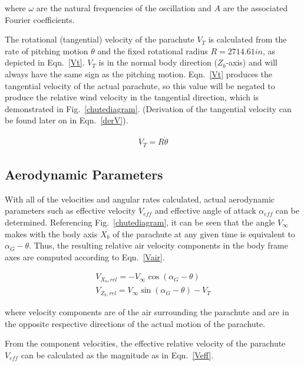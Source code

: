 \documentclass[]{aiaa-tc}%
\begin{document}
\noindent where $\omega$ are the natural frequencies of the oscillation and $A$ are the associated Fourier coefficients.

The rotational (tangential) velocity of the parachute $V_T$ is calculated from the rate of pitching motion $\dot{\theta}$ and the fixed rotational radius $R=2714.61 in$, as depicted in Eqn.~\ref{Vt}.  $V_T$ is in the normal body direction ($Z_b$-axis) and will always have the same sign as the pitching motion.  Eqn.~\ref{Vt} produces the tangential velocity of the actual parachute, so this value will be negated to produce the relative wind velocity in the tangential direction, which is demonstrated in Fig.~\ref{chutediagram}.  (Derivation of the tangential velocity can be found later on in Eqn.~\ref{derV}).

\begin{equation} \label{Vt}
\begin{gathered}
V_T = R \dot{\theta}
\end{gathered}
\end{equation}

\subsection{Aerodynamic Parameters}

With all of the velocities and angular rates calculated, actual aerodynamic parameters such as effective velocity $V_{eff}$ and effective angle of attack $\alpha_{eff}$ can be determined.  Referencing Fig.~\ref{chutediagram}, it can be seen that the angle $V_{\infty}$ makes with the body axis $X_b$ of the parachute at any given time is equivalent to $\alpha_G - \theta$.  Thus, the resulting relative air velocity components in the body frame axes are computed according to Eqn.~\ref{Vair}.

\begin{equation} \label{Vair}
\begin{gathered}
V_{X_b,rel} = -V_{\infty}\cos(\alpha_G - \theta) \\
V_{Z_b,rel} = V_{\infty}\sin(\alpha_G - \theta) - V_T
\end{gathered}
\end{equation}

\noindent where velocity components are of the air surrounding the parachute and are in the opposite respective directions of the actual motion of the parachute.

From the component velocities, the effective relative velocity of the parachute $V_{eff}$ can be calculated as the magnitude as in Eqn.~\ref{Veff}.
\end{document}
